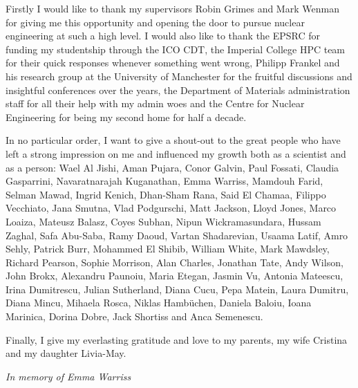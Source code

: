 \cleardoublepage


\begin{acknowledgements}

Firstly I would like to thank my supervisors Robin Grimes and Mark Wenman for giving me this opportunity and opening the door to pursue nuclear engineering at such a high level. I would also like to thank the EPSRC for funding my studentship through the ICO CDT, the Imperial College HPC team for their quick responses whenever something went wrong, Philipp Frankel and his research group at the University of Manchester for the fruitful discussions and insightful conferences over the years, the Department of Materials administration staff for all their help with my admin woes and the Centre for Nuclear Engineering for being my second home for half a decade.

In no particular order, I want to give a shout-out to the great people who have left a strong impression on me and influenced my growth both as a scientist and as a person: Wael Al Jishi, Aman Pujara, Conor Galvin, Paul Fossati, Claudia Gasparrini, Navaratnarajah Kuganathan, Emma Warriss, Mamdouh Farid, Selman Mawad, Ingrid Kenich, Dhan-Sham Rana, Said El Chamaa, Filippo Vecchiato, Jana Smutna, Vlad Podgurschi, Matt Jackson, Lloyd Jones, Marco Loaiza, Mateusz Balasz, Coyes Subhan, Nipun Wickramasundara, Hussam Zaghal, Safa Abu-Saba, Ramy Daoud, Vartan Shadarevian, Usaama Latif, Amro Sehly, Patrick Burr, Mohammed El Shibib, William White, Mark Mawdsley, Richard Pearson, Sophie Morrison, Alan Charles, Jonathan Tate, Andy Wilson, John Brokx, Alexandru Paunoiu, Maria Etegan, Jasmin Vu, Antonia Mateescu, Irina Dumitrescu, Julian Sutherland, Diana Cucu, Pepa Matein, Laura Dumitru, Diana Mincu, Mihaela Rosca, Niklas Hamb\"{u}chen, Daniela Baloiu, Ioana Marinica, Dorina Dobre, Jack Shortiss and Anca Semenescu. 

Finally, I give my everlasting gratitude and love to my parents, my wife Cristina and my daughter Livia-May.

\clearpage

\begin{center}
\emph{In memory of Emma Warriss}
\end{center}

\end{acknowledgements}